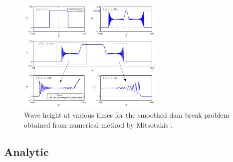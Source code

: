 \documentclass[pdf]{beamer}
\begin{document}
\begin{frame}{}
	
	\begin{figure}
		\centering
		\includegraphics[width=7cm]{../Pics/Lit/SmoothDBDutyhk.png}
		\caption{Wave height at various times for the smoothed dam break problem obtained from numerical method by Mitsotakis \cite{Mitsotakis-etal-2014}.}
		\label{fig:DuthykDB}
	\end{figure}	
\end{frame}

\subsection{Analytic}
\end{document}
